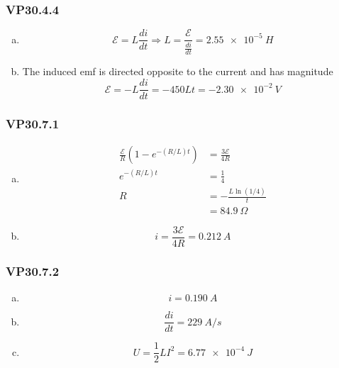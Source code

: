 \documentclass{article}
\begin{document}
\subsubsection{VP30.4.4}

\begin{enumerate}[(a)]
  \item \[\mathcal{E} = L \frac{di}{dt} \Rightarrow L = \frac{\mathcal{E}}{\frac{di}{dt}} = \qty{2.55e-5}{H}\]

  \item The induced emf is directed opposite to the current and has magnitude \[\mathcal{E} = -L \frac{di}{dt} = -450 L t = \qty{-2.30e-2}{V}\]
\end{enumerate}

\subsubsection{VP30.7.1}

\begin{enumerate}[(a)]
  \item

        \begin{align*}
          \frac{\mathcal{E}}{R} (1 - e^{-(R / L) t}) & = \frac{3 \mathcal{E}}{4 R} \\
          e^{-(R / L) t}                             & = \frac{1}{4}               \\
          R                                          & = -\frac{L \ln (1 / 4)}{t}  \\
                                                     & = \qty{84.9}{\Omega}
        \end{align*}

  \item \[i = \frac{3 \mathcal{E}}{4 R} = \qty{0.212}{A}\]
\end{enumerate}

\subsubsection{VP30.7.2}

\begin{enumerate}[(a)]
  \item \[i = \qty{0.190}{A}\]

  \item \[\frac{di}{dt} = \qty{229}{A/s}\]

  \item \[U = \frac{1}{2} L I^2 = \qty{6.77e-4}{J}\]
\end{enumerate}
\end{document}
